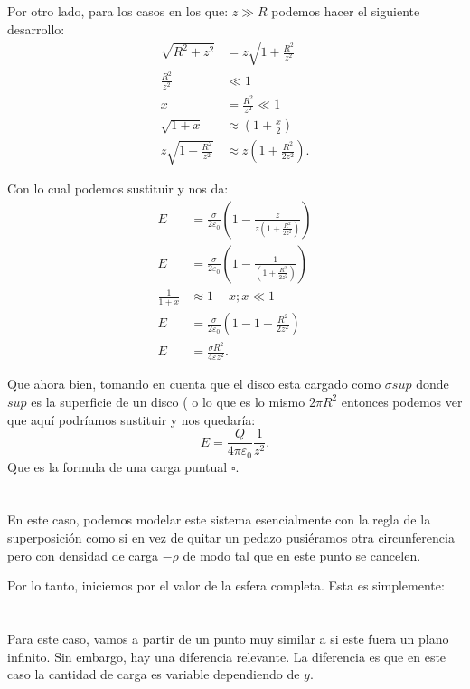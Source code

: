 \documentclass{report}
\begin{document}
Por otro lado, para los casos en los que: $z \gg R$ podemos hacer el siguiente desarrollo:
\begin{align*}
  \sqrt{R^2 + z^2} &= z\sqrt{1 + \frac{R^2}{z^2}}  \\
  \frac{R^2}{z^2} &\ll 1\\
  x &= \frac{R^2}{z^2} \ll 1 \\
  \sqrt{1 + x} &\approx \left( 1 + \frac{x}{2} \right) \\
  z\sqrt{1 + \frac{R^2}{z^2}} &\approx z\left( 1 + \frac{R^2}{2z^2} \right) 
.\end{align*}

Con lo cual podemos sustituir y nos da:
\begin{align*}
  E &= \frac{\sigma}{2\varepsilon_0} \left( 1 - \frac{z}{z\left( 1 + \frac{R^2}{2z^2} \right) } \right) \\
  E &= \frac{\sigma}{2\varepsilon_0} \left( 1 - \frac{1}{\left( 1 + \frac{R^2}{2z^2} \right) } \right) \\
  \frac{1}{1 + x} &\approx 1 - x; x \ll 1\\
  E &= \frac{\sigma}{2\varepsilon_0}\left( 1 - 1 + \frac{R^2}{2z^2} \right)  \\
  E &= \frac{\sigma R^2}{4\varepsilon z^2}
.\end{align*}

Que ahora bien, tomando en cuenta que el disco esta cargado como $\sigma sup$ donde  $sup$ es la superficie de un disco ( o lo que es lo mismo $2\pi R^2$ entonces podemos ver que aquí podríamos sustituir y nos quedaría: \[
E = \frac{Q}{4\pi\varepsilon_0} \frac{1}{z^2}
.\]  Que es la formula de una carga puntual $\square$.

\chapter{}

En este caso, podemos modelar este sistema esencialmente con la regla de la superposición como si en vez de quitar un pedazo pusiéramos otra circunferencia pero con densidad de carga $-\rho$ de modo tal que en este punto se cancelen.

Por lo tanto, iniciemos por el valor de la esfera completa. Esta es simplemente:

\chapter{}

Para este caso, vamos a partir de un punto muy similar a si este fuera un plano infinito. Sin embargo, hay una diferencia relevante. La diferencia es que en este caso la cantidad de carga es  variable dependiendo de $y$.
\end{document}
